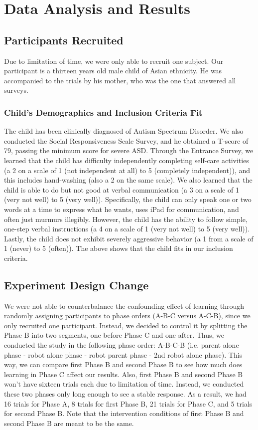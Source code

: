 \section{Data Analysis and Results}


\subsection{Participants Recruited}
Due to limitation of time, we were only able to recruit one subject.  Our participant is a thirteen years old male child of Asian ethnicity.  He was accompanied to the trials by his mother, who was the one that answered all surveys.

\subsubsection{Child's Demographics and Inclusion Criteria Fit}
The child has been clinically diagnosed of Autism Spectrum Disorder.  We also conducted the Social Responsiveness Scale Survey, and he obtained a T-score of 79, passing the minimum score for severe ASD.  Through the Entrance Survey, we learned that the child has difficulty independently completing self-care activities (a 2 on a scale of 1 (not independent at all) to 5 (completely independent)), and this includes hand-washing (also a 2 on the same scale).  We also learned that the child is able to do but not good at verbal communication (a 3 on a scale of 1 (very not well) to 5 (very well)).  Specifically, the child can only speak one or two words at a time to express what he wants, uses iPad for communication, and often just murmurs illegibly.  However, the child has the ability to follow simple, one-step verbal instructions (a 4 on a scale of 1 (very not well) to 5 (very well)).  Lastly, the child does not exhibit severely aggressive behavior (a 1 from a scale of 1 (never) to 5 (often)).  The above shows that the child fits in our inclusion criteria.


\subsection{Experiment Design Change}
We were not able to counterbalance the confounding effect of learning through randomly assigning participants to phase orders (A-B-C versus A-C-B), since we only recruited one participant.  Instead, we decided to control it by splitting the Phase B into two segments, one before Phase C and one after.  Thus, we conducted the study in the following phase order: A-B-C-B (i.e. parent alone phase - robot alone phase - robot parent phase - 2nd robot alone phase).  This way, we can compare first Phase B and second Phase B to see how much does learning in Phase C affect our results.  Also, first Phase B and second Phase B won't have sixteen trials each due to limitation of time.  Instead, we conducted these two phases only long enough to see a stable response.  As a result, we had 16 trials for Phase A, 8 trials for first Phase B, 21 trials for Phase C, and 5 trials for second Phase B.  Note that the intervention conditions of first Phase B and second Phase B are meant to be the same.


